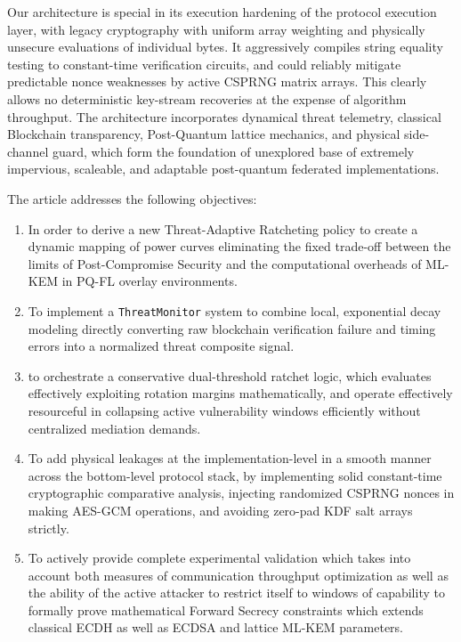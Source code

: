 \documentclass[journal, 10pt, twocolumn]{IEEEtran}
\begin{document}
Our architecture is special in its execution hardening of the protocol execution layer, with legacy cryptography with uniform array weighting and physically unsecure evaluations of individual bytes. It aggressively compiles string equality testing to constant-time verification circuits, and could reliably mitigate predictable nonce weaknesses by active CSPRNG matrix arrays. This clearly allows no deterministic key-stream recoveries at the expense of algorithm throughput. The architecture incorporates dynamical threat telemetry, classical Blockchain transparency, Post-Quantum lattice mechanics, and physical side-channel guard, which form the foundation of unexplored base of extremely impervious, scaleable, and adaptable post-quantum federated implementations.

The article addresses the following objectives:
\begin{enumerate}
\item In order to derive a new Threat-Adaptive Ratcheting policy to create a dynamic mapping of power curves eliminating the fixed trade-off between the limits of Post-Compromise Security and the computational overheads of ML-KEM in PQ-FL overlay environments.
\item To implement a \texttt{ThreatMonitor} system to combine local, exponential decay modeling directly converting raw blockchain verification failure and timing errors into a normalized threat composite signal.
\item to orchestrate a conservative dual-threshold ratchet logic, which evaluates effectively exploiting rotation margins mathematically, and operate effectively resourceful in collapsing active vulnerability windows efficiently without centralized mediation demands.
\item To add physical leakages at the implementation-level in a smooth manner across the bottom-level protocol stack, by implementing solid constant-time cryptographic comparative analysis, injecting randomized CSPRNG nonces in making AES-GCM operations, and avoiding zero-pad KDF salt arrays strictly.
\item To actively provide complete experimental validation which takes into account both measures of communication throughput optimization as well as the ability of the active attacker to restrict itself to windows of capability to formally prove mathematical Forward Secrecy constraints which extends classical ECDH as well as ECDSA and lattice ML-KEM parameters.
\end{enumerate}
\end{document}
